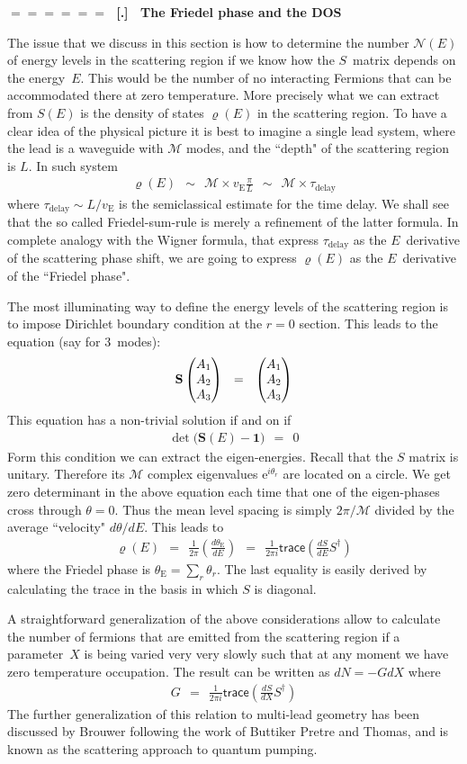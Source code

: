 \documentclass[onecolumn,fleqn]{revtex4}
\newcommand{\trc}{\mathsf{trace}}
\newcommand{\eexp}{\mathrm{e}^}
\newcommand{\gdos}{\varrho} \newcommand{\EPS}{\mathcal{E}}
\newcommand{\tbox}[1]{\text{#1}}
\newcommand{\amatrix}[1]{\begin{matrix} #1 \end{matrix}}
\newcommand{\beq}{\begin{eqnarray}}
\newcommand{\eeq}{\end{eqnarray}}
\renewcommand{\thesubsection}{\arabic{subsection}}
\renewcommand{\thesubsubsection}{\arabic{subsubsection}}
\newcommand{\sheadC}[1]
{
\addtocounter{subsubsection}{1}
\vspace{5mm}
{\Large\bf $=\!=\!=\!=\!=\!=\;$ [\thesubsection.\thesubsubsection] \ #1}  
\nopagebreak
\phantomsection
}
\begin{document}
\sheadC{The Friedel phase and the DOS} 


The issue that we discuss in this section is how 
to determine the number $\mathcal{N}(E)$  
of energy levels in the scattering region if we know 
how the $S$~matrix depends on the energy~$E$.
This would be the number of no interacting Fermions 
that can be accommodated there at zero temperature.
More precisely what we can extract from $S(E)$ 
is the density of states $\gdos(E)$ in the scattering region. 
To have a clear idea of the physical picture it is best 
to imagine a single lead system, 
where the lead is a waveguide with $\mathcal{M}$ modes, 
and the ``depth" of the scattering region is $L$.
In such system 
\beq 
\gdos(E) 
\ \ \sim \ \ 
\mathcal{M} \times v_{\tbox{E}} \frac{\pi}{L}
\ \ \sim \ \
\mathcal{M}  \times \tau_{\tbox{delay}}
\eeq
where $\tau_{\tbox{delay}} \sim L/v_{\tbox{E}}$ 
is the semiclassical estimate for the time delay.  
We shall see that the so called Friedel-sum-rule 
is merely a refinement of the latter formula.
In complete analogy with the Wigner formula,  
that express $\tau_{\tbox{delay}}$ as 
the $E$~derivative of the scattering phase shift, 
we are going to express $\gdos(E)$ as 
the $E$~derivative of the ``Friedel phase". 

 

The most illuminating way to define the energy levels 
of the scattering region is to impose Dirichlet boundary 
condition at the $r=0$ section. This leads to 
the equation (say for 3~modes):
\beq 
\mathbf{S} 
\left(\amatrix{A_1\cr A_2\cr A_3}\right)
\ \ = \ \ 
\left(\amatrix{A_1\cr A_2\cr A_3}\right)
\eeq
This equation has a non-trivial solution if and on if 
\beq 
\det\Big( \mathbf{S}(E) - \bm{1} \Big) \ \ = \ \ 0
\eeq
Form this condition we can extract the eigen-energies. 
Recall that the $S$ matrix is unitary.  
Therefore its $\mathcal{M}$ complex eigenvalues ${\eexp{i\theta_r}}$ 
are located on a circle. We get zero determinant 
in the above equation each time that one of the 
eigen-phases cross through ${\theta=0}$. 
Thus the mean level spacing is simply $2\pi/\mathcal{M}$ 
divided by the average ``velocity" $d\theta/dE$.  
This leads to 
\beq 
\gdos(E)
\ \ = \ \ 
\frac{1}{2\pi} \left(\frac{d\theta_{\tbox{E}}}{dE}\right)
\ \ = \ \ 
\frac{1}{2\pi i}\trc\left(\frac{dS}{dE}S^{\dagger}\right)
\eeq 
where the Friedel phase is ${\theta_{\tbox{E}}=\sum_r \theta_r}$.
The last equality is easily derived by calculating the 
trace in the basis in which $S$ is diagonal.


A straightforward generalization of the above considerations 
allow to calculate the number of fermions that are emitted 
from the scattering region if a parameter~$X$ is being varied 
very very slowly such that at any moment we have zero temperature 
occupation. The result can be written as ${dN=-GdX}$ where 
\beq 
G
\ \ = \ \ 
\frac{1}{2\pi i}\trc\left(\frac{dS}{dX}S^{\dagger}\right)
\eeq 
The further generalization of this relation to multi-lead geometry 
has been discussed by Brouwer following the work of Buttiker Pretre and Thomas, 
and is known as the scattering approach to quantum pumping. 
  
\end{document}
